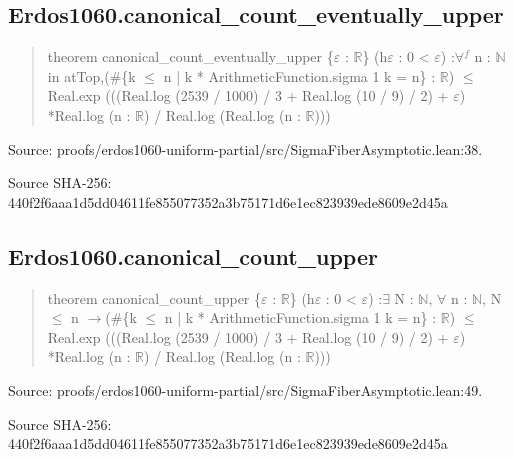 \documentclass[11pt,a4paper]{article}
\begin{document}
\begin{samepage}
\subsection{Erdos1060.canonical\_count\_eventually\_upper}
\begin{quote}\small\ttfamily theorem canonical\_count\_eventually\_upper \{\ensuremath{\varepsilon} : \ensuremath{\mathbb{R}}\} (h\ensuremath{\varepsilon} : 0 < \ensuremath{\varepsilon}) :\newline     \ensuremath{\forall}\ensuremath{^{f}} n : \ensuremath{\mathbb{N}} in atTop,\newline       (\#\{k \ensuremath{\leq} n | k * ArithmeticFunction.sigma 1 k = n\} : \ensuremath{\mathbb{R}}) \ensuremath{\leq}\newline         Real.exp (((Real.log (2539 / 1000) / 3 + Real.log (10 / 9) / 2) + \ensuremath{\varepsilon}) *\newline           Real.log (n : \ensuremath{\mathbb{R}}) / Real.log (Real.log (n : \ensuremath{\mathbb{R}})))\end{quote}
{\small Source: proofs/erdos1060-uniform-partial/src/SigmaFiberAsymptotic.lean:38.\par}

{\small Source SHA-256: 440f2f6aaa1d5dd04611fe855077352a3b75171d6e1ec823939ede8609e2d45a\par}

\end{samepage}
\begin{samepage}
\subsection{Erdos1060.canonical\_count\_upper}
\begin{quote}\small\ttfamily theorem canonical\_count\_upper \{\ensuremath{\varepsilon} : \ensuremath{\mathbb{R}}\} (h\ensuremath{\varepsilon} : 0 < \ensuremath{\varepsilon}) :\newline     \ensuremath{\exists} N : \ensuremath{\mathbb{N}}, \ensuremath{\forall} n : \ensuremath{\mathbb{N}}, N \ensuremath{\leq} n \ensuremath{\to}\newline       (\#\{k \ensuremath{\leq} n | k * ArithmeticFunction.sigma 1 k = n\} : \ensuremath{\mathbb{R}}) \ensuremath{\leq}\newline         Real.exp (((Real.log (2539 / 1000) / 3 + Real.log (10 / 9) / 2) + \ensuremath{\varepsilon}) *\newline           Real.log (n : \ensuremath{\mathbb{R}}) / Real.log (Real.log (n : \ensuremath{\mathbb{R}})))\end{quote}
{\small Source: proofs/erdos1060-uniform-partial/src/SigmaFiberAsymptotic.lean:49.\par}

{\small Source SHA-256: 440f2f6aaa1d5dd04611fe855077352a3b75171d6e1ec823939ede8609e2d45a\par}

\end{samepage}
\end{document}
